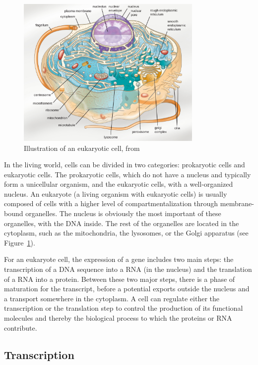 \begin{figure}[h]
    \centering
    \includegraphics[width=0.8\textwidth]{figures/introduction/cell_eukaryotic.jpg}
    \caption[Eukariotic cell]{Illustration of an eukaryotic cell, from~\cite{parker2017microbiology}}
    \label{fig:eukaryotic_cell}
\end{figure}

In the living world, cells can be divided in two categories: prokaryotic cells and eukaryotic cells.
The prokaryotic cells, which do not have a nucleus and typically form a unicellular organism, and the eukaryotic cells, with a well-organized nucleus.
An eukaryote (a living organism with eukaryotic cells) is usually composed of cells with a higher level of compartmentalization through membrane-bound organelles.
The nucleus is obviously the most important of these organelles, with the \ac{DNA} inside.
The rest of the organelles are located in the cytoplasm, such as the mitochondria, the lysosomes, or the Golgi apparatus (see Figure~\ref{fig:eukaryotic_cell}).

For an eukaryote cell, the expression of a gene includes two main steps: the transcription of a \ac{DNA} sequence into a \ac{RNA} (in the nucleus) and the translation of a \ac{RNA} into a protein.
Between these two major steps, there is a phase of maturation for the transcript, before a potential exports outside the nucleus and a transport somewhere in the cytoplasm.
A cell can regulate either the transcription or the translation step to control the production of its functional molecules and thereby the biological process to which the proteins or \ac{RNA} contribute.

\subsection{Transcription}
\label{subsec:intro_transcription}

